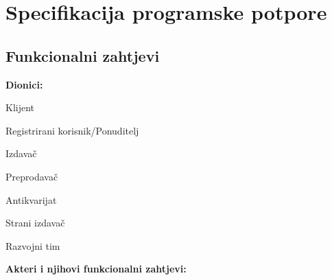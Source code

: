 \chapter{Specifikacija programske potpore}
		
	\section{Funkcionalni zahtjevi}
			
			\noindent \textbf{Dionici:}
			
			\begin{packed_enum}
				
				\item Klijent
				\item Registrirani korisnik/Ponuditelj		
				\begin{packed_enum}
                    				\item Izdavač
                    				\item Preprodavač
                   				\item Antikvarijat
                			\end{packed_enum}
                			\item Strani izdavač
                			\item Razvojni tim
			\end{packed_enum}
			
			\noindent \textbf{Akteri i njihovi funkcionalni zahtjevi:}
			
